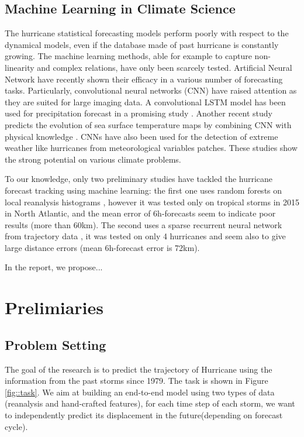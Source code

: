 \section{Machine Learning in Climate Science}

The hurricane statistical forecasting models perform poorly with respect to the dynamical models, even if the database made of past hurricane is constantly growing. The machine learning methods, able for example to capture non-linearity and complex relations, have only been scarcely tested. Artificial Neural Network have recently shown their efficacy in a various number of forecasting tasks. Particularly, convolutional neural networks (CNN) have raised attention as they are suited for large imaging data. A convolutional LSTM model has been used for precipitation forecast in a promising study \cite{xingjian2015convolutional}. Another recent study predicts the evolution of sea surface temperature maps by combining CNN with physical knowledge \cite{de2017deep}. CNNs have also been used for the detection of extreme weather like hurricanes from meteorological variables patches\cite{racah2017extremeweather}. These studies show the strong potential on various climate problems. 

To our knowledge, only two preliminary studies have tackled the hurricane forecast tracking using machine learning: the first one uses random forests on local reanalysis histograms \cite{liberge2011prevision}, however it was tested only on tropical storms in 2015 in North Atlantic, and the mean error of 6h-forecasts seem to indicate poor results (more than 60km). The second uses a sparse recurrent neural network from trajectory data \cite{moradi2016sparse}, it was tested on only 4 hurricanes and seem also to give large distance errors (mean 6h-forecast error is 72km). 

In the report, we propose...


\chapter{Prelimiaries}

\section{Problem Setting}
The goal of the research is to predict the trajectory of Hurricane using the information from the past storms since 1979. The task is shown in Figure \ref{fig::task}. We aim at building an end-to-end model using two types of data (reanalysis and hand-crafted features), for each time step of each storm, we want to independently predict its displacement in the future(depending on forecast cycle). 

